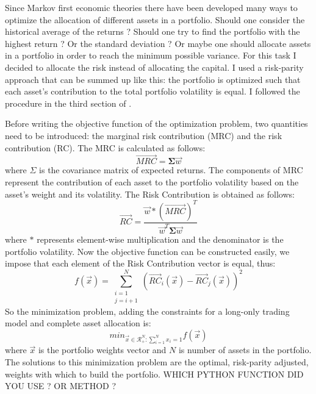 Since Markov first economic theories there have been developed many ways to optimize the allocation of different assets in a portfolio. Should one consider the historical average of the returns ? Should one try to find the portfolio with the highest return ? Or the standard deviation ? Or maybe one should allocate assets in a portfolio in order to reach the minimum possible variance. For this task I decided to allocate the risk instead of allocating the capital. I used a risk-parity approach that can be summed up like this: the portfolio is optimized such that each asset's contribution to the total portfolio volatility is equal. I followed the procedure in the third section of \cite{risk-parity-hard}.

Before writing the objective function of the optimization problem, two quantities need to be introduced: the marginal risk contribution (MRC) and the risk contribution (RC). The MRC is calculated as follows:
\begin{equation}
	\vec{\textit{MRC}} = \mathbf{\Sigma}\vec{w}
\end{equation}
where $\Sigma$ is the covariance matrix of expected returns. The components of MRC represent the contribution of each asset to the portfolio volatility based on the asset's weight and its volatility.
The Risk Contribution is obtained as follows:
\begin{equation}
	\vec{\textit{RC}} = \frac{\vec{w} * (\vec{\textit{MRC}})^T}{\Vec{w}^{T}\mathbf{\Sigma}\Vec{w}}
\end{equation}
where $*$ represents element-wise multiplication and the denominator is the portfolio volatility.
Now the objective function can be constructed easily, we impose that each element of the Risk Contribution vector is equal, thus:
\begin{equation}
	f(\vec{x}) = \sum_{\substack{i = 1 \\ j = i + 1}}^{N} (\vec{\textit{RC}}_i (\vec{x}) - \vec{\textit{RC}}_j (\vec{x}))^2 
	\label{risk-parity-objfunc}
\end{equation}
So the minimization problem, adding the constraints for a long-only trading model and complete asset allocation is:
\begin{equation}
	min_{\vec{x} \in \mathcal{R}^N_{+} : \sum_{i = 1}^{N} x_i = 1} f(\vec{x})
\end{equation}
where $\vec{x}$ is the portfolio weights vector and $N$ is number of assets in the portfolio.
The solutions to this minimization problem are the optimal, risk-parity adjusted, weights with which to build the portfolio. WHICH PYTHON FUNCTION DID YOU USE ? OR METHOD ?